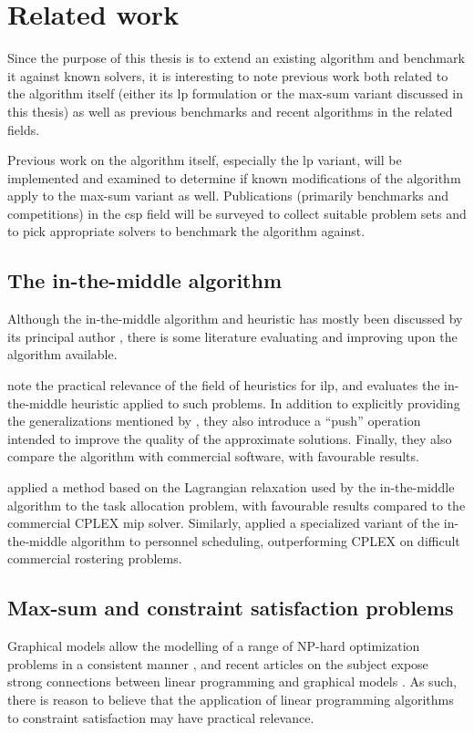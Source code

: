 \section{Related work}
Since the purpose of this thesis is to extend an existing algorithm and benchmark it against known solvers, it is interesting to note previous work both related to the algorithm itself (either its \gls{lp} formulation or the max-sum variant discussed in this thesis) as well as previous benchmarks and recent algorithms in the related fields.

Previous work on the algorithm itself, especially the \gls{lp} variant, will be implemented and examined to determine if known modifications of the algorithm apply to the max-sum variant as well.
Publications (primarily benchmarks and competitions) in the \gls{csp} field will be surveyed to collect suitable problem sets and to pick appropriate solvers to benchmark the algorithm against.

\subsection{The in-the-middle algorithm}
Although the in-the-middle algorithm and heuristic has mostly been discussed by its principal author \parencites{Wedelin95}{Wedelin08}{Wedelin13}{Alefragis00}, there is some literature evaluating and improving upon the algorithm available.

\Textcite{Bastert10} note the practical relevance of the field of heuristics for \gls{ilp}, and evaluates the in-the-middle heuristic applied to such problems. In addition to explicitly providing the generalizations mentioned by \textcite{Wedelin95}, they also introduce a \enquote{push} operation intended to improve the quality of the approximate solutions. Finally, they also compare the algorithm with commercial software, with favourable results.

\Textcite{Ernst05} applied a method based on the Lagrangian relaxation used by the in-the-middle algorithm to the task allocation problem, with favourable results compared to the commercial CPLEX \gls{mip} solver.
Similarly, \textcite{Mason01} applied a specialized variant of the in-the-middle algorithm to personnel scheduling, outperforming CPLEX on difficult commercial rostering problems.

\subsection{Max-sum and constraint satisfaction problems}
Graphical models allow the modelling of a range of NP-hard optimization problems in a consistent manner \parencite{deGivry14}, and recent articles on the subject expose strong connections between linear programming and graphical models \parencites{Werner07}{Kolmogorov13}.
As such, there is reason to believe that the application of linear programming algorithms to constraint satisfaction may have practical relevance.

